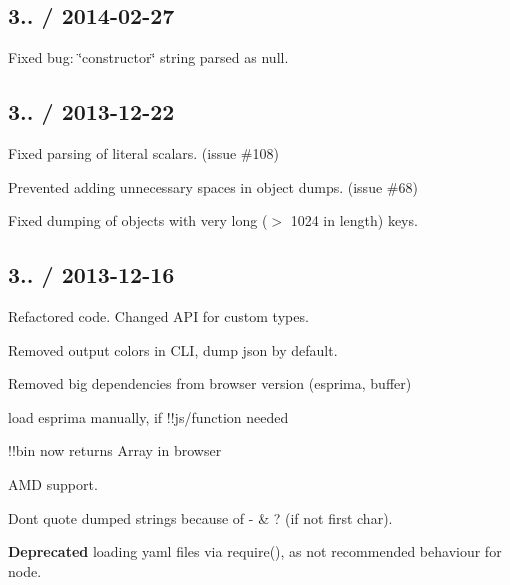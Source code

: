 \subsection*{3.. / 2014-\/02-\/27 }


\begin{DoxyItemize}
\item Fixed bug\+: \char`\"{}constructor\char`\"{} string parsed as {\ttfamily null}.
\end{DoxyItemize}

\subsection*{3.. / 2013-\/12-\/22 }


\begin{DoxyItemize}
\item Fixed parsing of literal scalars. (issue \#108)
\item Prevented adding unnecessary spaces in object dumps. (issue \#68)
\item Fixed dumping of objects with very long ($>$ 1024 in length) keys.
\end{DoxyItemize}

\subsection*{3.. / 2013-\/12-\/16 }


\begin{DoxyItemize}
\item Refactored code. Changed A\+PI for custom types.
\item Removed output colors in C\+LI, dump json by default.
\item Removed big dependencies from browser version (esprima, buffer)
\begin{DoxyItemize}
\item load {\ttfamily esprima} manually, if !!js/function needed
\item !!bin now returns Array in browser
\end{DoxyItemize}
\item A\+MD support.
\item Don\textquotesingle{}t quote dumped strings because of {\ttfamily -\/} \& {\ttfamily ?} (if not first char).
\item {\bfseries Deprecated} loading yaml files via {\ttfamily require()}, as not recommended behaviour for node.
\end{DoxyItemize}


